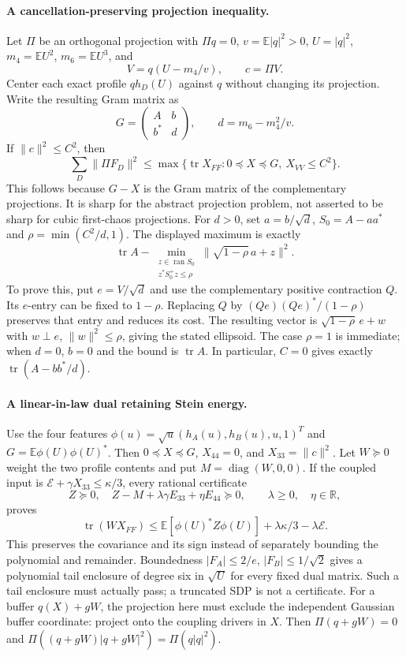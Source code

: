 \paragraph{A cancellation-preserving projection inequality.}
Let $\Pi$ be an orthogonal projection with $\Pi q=0$, $v=\mathbb E|q|^2>0$,
$U=|q|^2$, $m_4=\mathbb EU^2$, $m_6=\mathbb EU^3$, and
\[
 V=q(U-m_4/v),\qquad c=\Pi V.
\]
Center each exact profile $q h_D(U)$ against $q$ without changing its
projection. Write the resulting Gram matrix as
\[
 G=\begin{pmatrix}A&b\\b^*&d\end{pmatrix},\qquad d=m_6-m_4^2/v.
\]
If $\|c\|^2\le C^2$, then
\[
 \sum_D\|\Pi F_D\|^2\le
 \max\{\operatorname{tr}X_{FF}:0\preceq X\preceq G,\ X_{VV}\le C^2\}.
\]
This follows because $G-X$ is the Gram matrix of the complementary
projections. It is sharp for the abstract projection problem, not asserted
to be sharp for cubic first-chaos projections.
For $d>0$, set $a=b/\sqrt d$, $S_0=A-aa^*$ and
$\rho=\min(C^2/d,1)$. The displayed maximum is exactly
\[
 \operatorname{tr}A-\min_{\substack{z\in\operatorname{ran}S_0\\
 z^*S_0^+z\le\rho}}\|\sqrt{1-\rho}\,a+z\|^2.
\]
To prove this, put $e=V/\sqrt d$ and use the complementary positive
contraction $Q$. Its $e$-entry can be fixed to $1-\rho$. Replacing $Q$ by
$(Qe)(Qe)^*/(1-\rho)$ preserves that entry and reduces its cost.
The resulting vector is $\sqrt{1-\rho}\,e+w$ with $w\perp e$,
$\|w\|^2\le\rho$, giving the stated ellipsoid. The case $\rho=1$ is
immediate; when $d=0$, $b=0$ and the bound is $\operatorname{tr}A$.
In particular, $C=0$ gives exactly $\operatorname{tr}(A-bb^*/d)$.

\paragraph{A linear-in-law dual retaining Stein energy.}
Use the four features
$\phi(u)=\sqrt u(h_A(u),h_B(u),u,1)^T$ and $G=\mathbb E\phi(U)\phi(U)^*$.
Then $0\preceq X\preceq G$, $X_{44}=0$, and $X_{33}=\|c\|^2$.
Let $W\succeq0$ weight the two profile contents and put
$M=\operatorname{diag}(W,0,0)$. If the coupled input is
$\mathcal E+\gamma X_{33}\le\kappa/3$, every rational certificate
\[
 Z\succeq0,\quad Z-M+\lambda\gamma E_{33}+\eta E_{44}\succeq0,
 \qquad\lambda\ge0,\quad\eta\in\mathbb R,
\]
proves
\[
 \operatorname{tr}(WX_{FF})\le
 \mathbb E[\phi(U)^*Z\phi(U)]+\lambda\kappa/3-\lambda\mathcal E.
\]
This preserves the covariance and its sign instead of separately bounding
the polynomial and remainder. Boundedness
$|F_A|\le2/e$, $|F_B|\le1/\sqrt2$ gives a polynomial tail enclosure of
degree six in $\sqrt U$ for every fixed dual matrix. Such a tail enclosure
must actually pass; a truncated SDP is not a certificate.
For a buffer $q(X)+gW$, the projection here must exclude the independent
Gaussian buffer coordinate: project onto the coupling drivers in $X$.
Then $\Pi(q+gW)=0$ and $\Pi((q+gW)|q+gW|^2)=\Pi(q|q|^2)$.

